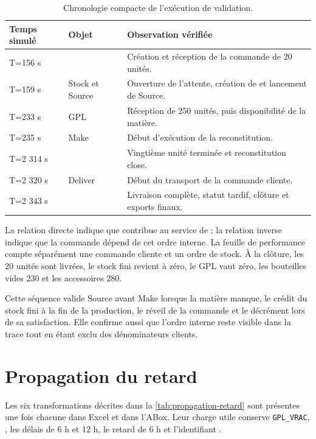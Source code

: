 \begin{table}[H]
  \centering
  \caption{Chronologie compacte de l'exécution de validation.}
  \label{tab:chronologie-execution-vsm}
  \begin{tabularx}{\textwidth}{@{}L{0.17\textwidth}L{0.26\textwidth}Y@{}}
    \toprule
    Temps simulé & Objet & Observation vérifiée \\
    \midrule
    T=156 s &  & Création et réception de la commande de 20 unités. \\
    T=159 s & Stock et Source & Ouverture de l'attente, création de  et lancement de Source. \\
    T=233 s & GPL & Réception de 250 unités, puis disponibilité de la matière. \\
    T=235 s & Make & Début d'exécution de la reconstitution. \\
    T=2 314 s &  & Vingtième unité terminée et reconstitution close. \\
    T=2 320 s & Deliver & Début du transport de la commande cliente. \\
    T=2 343 s &  & Livraison complète, statut tardif, clôture et exports finaux. \\
    \bottomrule
  \end{tabularx}
\end{table}

La relation directe indique que  contribue au service de ; la relation inverse indique que la commande dépend de cet ordre interne. La feuille de performance compte séparément une commande cliente et un ordre de stock. À la clôture, les 20 unités sont livrées, le stock fini revient à zéro, le GPL vaut zéro, les bouteilles vides 230 et les accessoires 280.

Cette séquence valide Source avant Make lorsque la matière manque, le crédit du stock fini à la fin de la production, le réveil de la commande et le décrément lors de sa satisfaction. Elle confirme aussi que l'ordre interne reste visible dans la trace tout en étant exclu des dénominateurs clients.

\section{Propagation du retard}

Les six transformations décrites dans la \cref{tab:propagation-retard} sont présentes une fois chacune dans Excel et dans l'ABox. Leur charge utile conserve \texttt{GPL\_VRAC}, , les délais de 6 h et 12 h, le retard de 6 h et l'identifiant .

